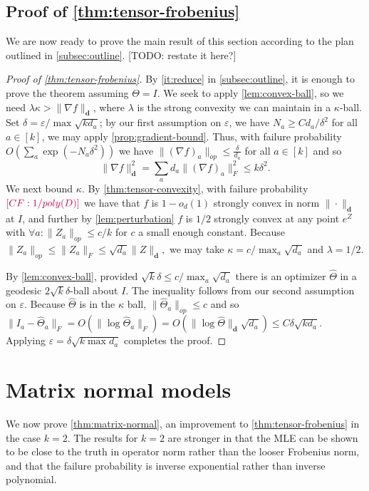 \documentclass{article}
\renewcommand{\vec}{\bm}
\newcommand\eps{\varepsilon}
\newcommand{\CF}[1]{{\color{purple}[CF: #1]}}
\newcommand{\TODO}[1]{{\color{blue}[TODO: #1]}}
\begin{document}
\subsection{Proof of \cref{thm:tensor-frobenius}}
We are now ready to prove the main result of this section according to the plan outlined in \cref{subsec:outline}.
\TODO{restate it here?}
\begin{proof}[Proof of \cref{thm:tensor-frobenius}]By \cref{it:reduce} in \cref{subsec:outline}, it is enough to prove the theorem assuming $\Theta = I$.
We seek to apply \cref{lem:convex-ball}, so we need $\lambda \kappa > \|\nabla f\|_{\vec d}$, where $\lambda$ is the strong convexity we can maintain in a $\kappa$-ball. Set $\delta = \eps/\max \sqrt{k d_a}$; by our first assumption on $\eps$, we have $N_a \geq C d_a/\delta^2$ for all $a \in [k]$, we may apply \cref{prop:gradient-bound}. Thus, with failure probability $O\left( \sum_a \exp ( - N_a \delta^2)\right)$ we have $\|(\nabla f)_{a}\|_{op} \leq \frac{\delta}{d_{a}}$ for all $a \in [k]$ and so
\[  \|\nabla f\|_{\vec d}^{2} = \sum_{a} d_{a} \|(\nabla f)_{a}\|_{F}^{2} \leq  k \delta^{2}.  \]
We next bound $\kappa$. By \cref{thm:tensor-convexity}, with failure probability $\CF{1/poly(D)}$ we have that $f$ is $1-o_{d}(1)$ strongly convex in norm $\|\cdot\|_{\vec d}$ at $I$, and further by \cref{lem:perturbation} $f$ is $1/2$ strongly convex at any point $e^{Z}$ with $\forall a: \|Z_{a}\|_{op} \leq  c/k$ for $c$ a small enough constant. Because $\|Z_a\|_{op} \leq \|Z_a\|_F \leq \sqrt{d_a} \|Z\|_{\vec d},$ we may take $\kappa = c/\max_a \sqrt{d_a}$ and $\lambda = 1/2$.

By \cref{lem:convex-ball}, provided $\sqrt{k} \delta \leq c/\max_a \sqrt{d_a} $ there is an optimizer $\widehat{\Theta}$ in a geodesic $2 \sqrt{k} \delta$-ball about $I$. The inequality follows from our second assumption on $\eps$. Because $\widehat{\Theta}$ is in the $\kappa$ ball, $\|\widehat{\Theta}_a\|_{op} \leq c$ and so $\|I_a - \widehat{\Theta}_a\|_F = O( \| \log \widehat{\Theta}_a\|_F) = O( \|\log \widehat{\Theta}\|_{\vec d} \sqrt{d_a})  \leq C \delta \sqrt{k d_a}.$ Applying $\eps = \delta \sqrt{k \max d_a}$ completes the proof.
\end{proof}

\section{Matrix normal models}\label{sec:matrix-normal}
We now prove \cref{thm:matrix-normal}, an improvement to \cref{thm:tensor-frobenius} in the case $k=2$. The results for $k = 2$ are stronger in that the MLE can be shown to be close to the truth in operator norm rather than the looser Frobenius norm, and that the failure probability is inverse exponential rather than inverse polynomial.
\end{document}
